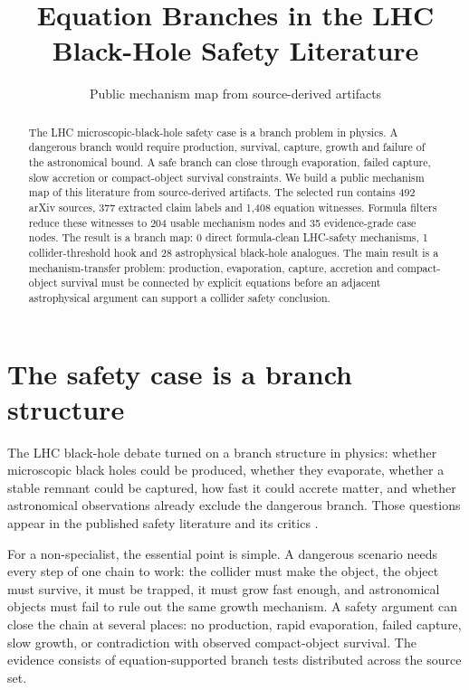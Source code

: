 \documentclass[11pt]{article}
\title{Equation Branches in the LHC Black-Hole Safety Literature}
\author{Public mechanism map from source-derived artifacts}
\date{}
\begin{document}
\maketitle

\begin{abstract}
The LHC microscopic-black-hole safety case is a branch problem in physics. A
dangerous branch would require production, survival, capture, growth and failure
of the astronomical bound. A safe branch can close through evaporation, failed
capture, slow accretion or compact-object survival constraints. We build a public
mechanism map of this literature from source-derived artifacts. The selected run contains 492
arXiv sources, 377 extracted claim labels and
1,408 equation witnesses. Formula filters reduce
these witnesses to 204 usable mechanism
nodes and 35 evidence-grade
case nodes. The result is a branch map:
0 direct formula-clean
LHC-safety mechanisms, 1
collider-threshold hook and 28
astrophysical black-hole analogues. The main result is a mechanism-transfer
problem: production, evaporation, capture, accretion and compact-object survival
must be connected by explicit equations before an adjacent astrophysical argument
can support a collider safety conclusion.
\end{abstract}

\section{The safety case is a branch structure}

The LHC black-hole debate turned on a branch structure in physics: whether
microscopic black holes could be
produced, whether they evaporate, whether a stable remnant could be captured, how
fast it could accrete matter, and whether astronomical observations already exclude
the dangerous branch. Those questions appear in the published safety literature and
its critics \cite{GiddingsMangano2008,Ellis2008,Plaga2008,Koch2008,GiddingsManganoComment2008,Casadio2009}.

For a non-specialist, the essential point is simple. A dangerous scenario needs
every step of one chain to work: the collider must make the object, the object
must survive, it must be trapped, it must grow fast enough, and astronomical
objects must fail to rule out the same growth mechanism. A safety argument can
close the chain at several places: no production, rapid evaporation, failed
capture, slow growth, or contradiction with observed compact-object survival.
	The evidence consists of equation-supported branch tests distributed across
	the source set.
\end{document}
